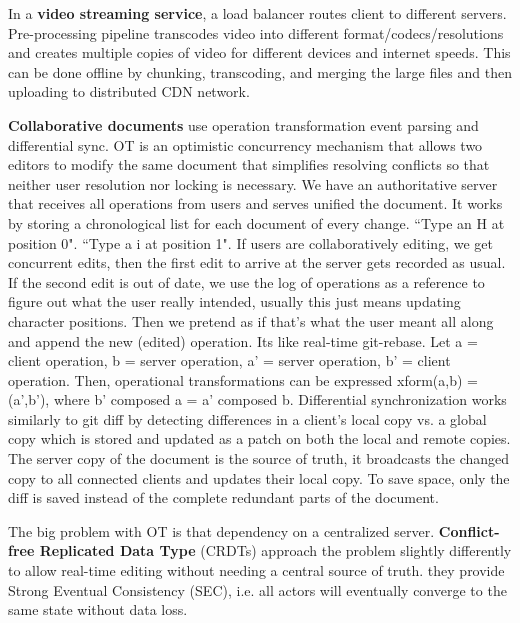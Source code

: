 \documentclass{article}
\begin{document}
    In a \textbf{video streaming service}, a load balancer routes client to different servers. Pre-processing pipeline transcodes video into different format/codecs/resolutions and creates multiple copies of video for different devices and internet speeds. This can be done offline by chunking, transcoding, and merging the large files and then uploading to distributed CDN network.
    
    \textbf{Collaborative documents} use operation transformation event parsing and differential sync. OT is an optimistic concurrency mechanism that allows two editors to modify the same document that simplifies resolving conflicts so that neither user resolution nor locking is necessary. We have an authoritative server that receives all operations from users and serves unified the document. It works by storing a chronological list for each document of every change. ``Type an H at position 0". ``Type a i at position 1". If users are collaboratively editing, we get concurrent edits, then the first edit to arrive at the server gets recorded as usual. If the second edit is out of date, we use the log of operations as a reference to figure out what the user really intended, usually this just means updating character positions. Then we pretend as if that's what the user meant all along and append the new (edited) operation. Its like real-time git-rebase. Let a = client operation, b = server operation, a' = server operation, b' = client operation. Then, operational transformations can be expressed xform(a,b) = (a',b'), where b' composed a = a' composed b. Differential synchronization works similarly to git diff by detecting differences in a client's local copy vs. a global copy which is stored and updated as a patch on both the local and remote copies. The server copy of the document is the source of truth, it broadcasts the changed copy to all connected clients and updates their local copy. To save space, only the diff is saved instead of the complete redundant parts of the document. 
    
    The big problem with OT is that dependency on a centralized server. \textbf{Conflict-free Replicated Data Type} (CRDTs) approach the problem slightly differently to allow real-time editing without needing a central source of truth. they provide Strong Eventual Consistency (SEC), i.e. all actors will eventually converge to the same state without data loss.
    
\end{document}
